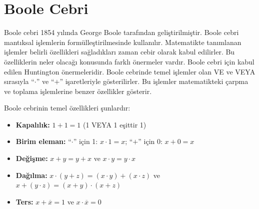 \section{Boole Cebri}

Boole cebri 1854 yılında George Boole tarafından geliştirilmiştir. Boole cebri mantıksal işlemlerin formülleştirilmesinde kullanılır. Matematikte tanımlanan işlemler belirli özellikleri sağladıkları zaman cebir olarak kabul edilirler. Bu özelliklerin neler olacağı konusunda farklı önermeler vardır. Boole cebri için kabul edilen Huntington önermeleridir. Boole cebrinde temel işlemler olan VE ve VEYA sırasıyla ``$\cdot$'' ve ``$+$'' işaretleriyle gösterilirler. Bu işlemler matematikteki çarpma ve toplama işlemlerine benzer özellikler gösterir.

Boole cebrinin temel özellikleri şunlardır:

\begin{itemize}
    \item \textbf{Kapalılık:} $1 + 1 = 1$ (1 VEYA 1 eşittir 1)
    \item \textbf{Birim eleman:} ``$\cdot$'' için 1: $x \cdot 1 = x$; ``$+$'' için 0: $x + 0 = x$
    \item \textbf{Değişme:} $x + y = y + x$ ve $x \cdot y = y \cdot x$
    \item \textbf{Dağılma:} $x \cdot (y + z) = (x \cdot y) + (x \cdot z)$ ve $x + (y \cdot z) = (x + y) \cdot (x + z)$
    \item \textbf{Ters:} $x + \overline{x} = 1$ ve $x \cdot \overline{x} = 0$
\end{itemize}

